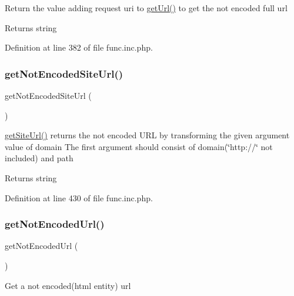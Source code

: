 Return the value adding request uri to \hyperlink{func_8inc_8php_accd14bda49a1044b4d8dd93f020f11ee}{get\+Url()} to get the not encoded full url

\begin{DoxyReturn}{Returns}
string 
\end{DoxyReturn}


Definition at line 382 of file func.\+inc.\+php.

\hypertarget{func_8inc_8php_aa09cef59156d4afaeee54a675605f95d}{}\label{func_8inc_8php_aa09cef59156d4afaeee54a675605f95d} 
\subsubsection{\texorpdfstring{get\+Not\+Encoded\+Site\+Url()}{getNotEncodedSiteUrl()}}
{\footnotesize\ttfamily get\+Not\+Encoded\+Site\+Url (\begin{DoxyParamCaption}{ }\end{DoxyParamCaption})}

\hyperlink{func_8inc_8php_a2d80ea9652d1586d5dcd03d022150f73}{get\+Site\+Url()} returns the not encoded U\+RL by transforming the given argument value of domain The first argument should consist of domain(\char`\"{}http\+://\char`\"{} not included) and path

\begin{DoxyReturn}{Returns}
string 
\end{DoxyReturn}


Definition at line 430 of file func.\+inc.\+php.

\hypertarget{func_8inc_8php_aa73dbeb07c5bcac26c24fe4c6b05d8d2}{}\label{func_8inc_8php_aa73dbeb07c5bcac26c24fe4c6b05d8d2} 
\subsubsection{\texorpdfstring{get\+Not\+Encoded\+Url()}{getNotEncodedUrl()}}
{\footnotesize\ttfamily get\+Not\+Encoded\+Url (\begin{DoxyParamCaption}{ }\end{DoxyParamCaption})}

Get a not encoded(html entity) url

